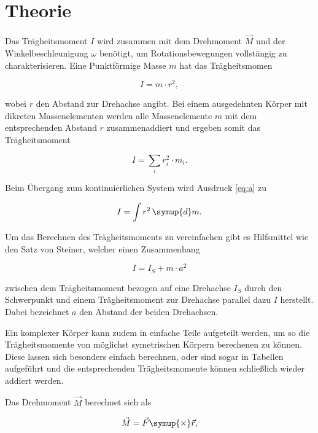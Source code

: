 \section{Theorie}
\label{sec:Theorie}

Das Trägheitsmoment $I$ wird zusammen mit dem
Drehmoment $\vec{M}$ und der Winkelbeschleunigung $\dot{\omega}$
benötigt, um Rotationsbewegungen vollstängig zu charakterisieren.
Eine Punktförmige Masse $m$ hat das Trägheitsmomen

\begin{equation}
    I=m \cdot r^2,
\end{equation}

\noindent wobei $r$ den Abstand zur Drehachse angibt.
Bei einem ausgedehnten Körper mit dikreten Massenelementen 
werden alle Massenelemente $m$ 
mit dem entsprechenden Abstand $r$ zusammenaddiert und 
ergeben somit das Trägheitsmoment

\begin{equation}
    I=\sum_i r_i^2 \cdot m_i.
    \label{eq:a}
\end{equation}

\noindent Beim Übergang zum kontinuierlichen System wird 
Ausdruck \ref{eq:a} zu

\begin{equation}
    I=\int r^2 \, \symup{d}m.
\end{equation}

\noindent Um das Berechnen des Trägheitsmoments zu vereinfachen
gibt es Hilfsmittel wie den Satz von Steiner, welcher
einen Zusammenhang 

\begin{equation}
    I=I_S+m \cdot a^2
    \label{eq:steiner}
\end{equation}

\noindent zwischen dem Trägheitsmoment bezogen auf eine
Drehachse $I_S$ durch den Schwerpunkt und einem Trägheitsmoment
zur Drehachse parallel dazu $I$ herstellt. Dabei bezeichnet $a$
den Abstand der beiden Drehachsen.

Ein komplexer Körper kann zudem in einfache Teile aufgeteilt werden, um
so die Trägheitsmomente von möglichst symetrischen Körpern berechenen
zu können. Diese lassen sich besonders einfach berechnen, oder
sind sogar in Tabellen aufgeführt und die 
entsprechenden Trägheitsmomente können schließlich wieder addiert werden.

Das Drehmoment $\vec{M}$ berechnet sich als

\begin{equation}
    \vec{M}=\vec{F} \symup{\times} \vec{r},
\end{equation}

